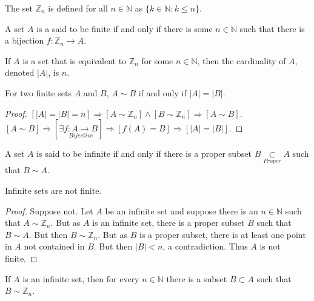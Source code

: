 \documentclass[crop=false,class=article,oneside]{standalone}
\begin{document}
            \begin{definition}
            The set $\mathbb{Z}_n$ is defined for all $n\in \mathbb{N}$ as $\{k\in \mathbb{N}: k\leq n\}$.
            \end{definition}
            \begin{definition}
            A set $A$ is a said to be finite if and only if there is some $n\in \mathbb{N}$ such that there is a bijection $f:\mathbb{Z}_n \rightarrow A$.
            \end{definition}
            \begin{definition}
            If $A$ is a set that is equivalent to $\mathbb{Z}_n$ for some $n\in \mathbb{N}$, then the cardinality of $A$, denoted $|A|$, is $n$.
            \end{definition}
            \begin{theorem}
            For two finite sets $A$ and $B$, $A\sim B$ if and only if $|A|=|B|$.
            \end{theorem}
            \begin{proof}
            $[|A|=|B|=n]\Rightarrow[A\sim \mathbb{Z}_n]\land[B\sim \mathbb{Z}_n]\Rightarrow [A\sim B]$. $[A\sim B]\Rightarrow [\exists \underset{Bijective}{f:A\rightarrow B}]\Rightarrow [f(A) = B]\Rightarrow [|A|=|B|]$.
            \end{proof}
            \begin{definition}
            A set $A$ is said to be infinite if and only if there is a proper subset $B\underset{Proper}\subset A$ such that $B\sim A$.
            \end{definition}
            \begin{theorem}
            Infinite sets are not finite.
            \end{theorem}
            \begin{proof}
            Suppose not. Let $A$ be an infinite set and suppose there is an $n\in \mathbb{N}$ such that $A\sim \mathbb{Z}_n$. But as $A$ is an infinite set, there is a proper subset $B$ such that $B\sim A$. But then $B\sim \mathbb{Z}_n$. But as $B$ is a proper subset, there is at least one point in $A$ not contained in $B$. But then $|B|<n$, a contradiction. Thus $A$ is not finite.
            \end{proof}
            \begin{corollary}
            If $A$ is an infinite set, then for every $n\in \mathbb{N}$ there is a subset $B\subset A$ such that $B\sim \mathbb{Z}_n$.
            \end{corollary}
\end{document}
